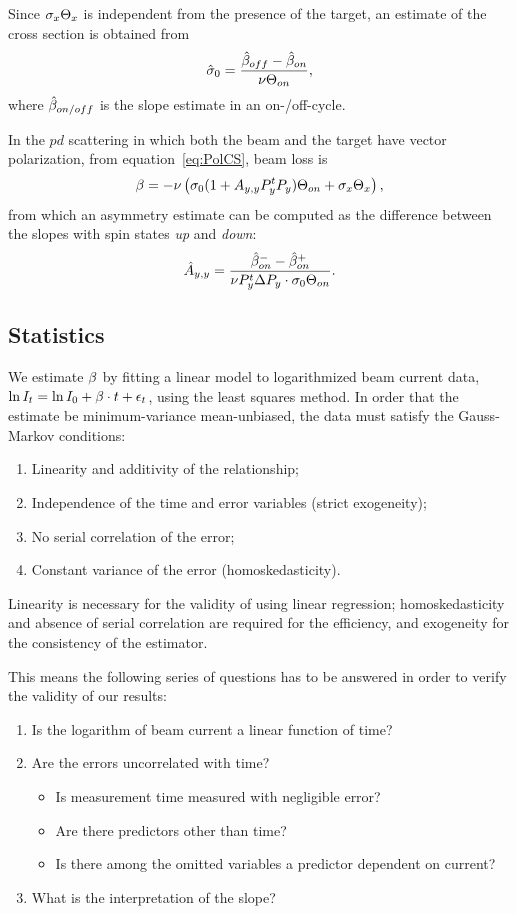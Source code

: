 \documentclass[reprint, superscriptaddress]{revtex4-1}
\begin{document}
Since $\CS[x]\Thick[x]$ is independent from the presence of the target, an estimate of the cross section is obtained from  
\begin{equation}
	\CS*[0] = \frac{\slp*[off] - \slp*[on]}{\nu\Thick[on]},
\end{equation}
where $\slp*[on/off]$ is the slope estimate in an on-/off-cycle.

In the $pd$ scattering in which both the beam and the target have vector polarization, from equation~\eqref{eq:PolCS}, beam loss is
\[
	\slp = -\nu\bkt{\CS[0](1 + \Ayy P_y^t P_y)\Thick[on] + \CS[x]\Thick[x]},
\]
from which an asymmetry estimate can be computed as the difference between the slopes with spin states \emph{up} and \emph{down}:
\begin{equation}\label{eq:AyyEst}
	\Ayy* = \frac{\slp*[on]^- - \slp*[on]^+}{\nu P_y^t\Delta P_y\cdot \CS[0]\Thick[on]}.
\end{equation}

\subsection{Statistics}

We estimate $\slp$ by fitting a linear model to logarithmized beam current data, $\ln I_t = \ln I_0 + \slp\cdot t + \epsilon_t$, using the least squares method. In order that the estimate be minimum-variance mean-unbiased, the data must satisfy the Gauss-Markov conditions:~\cite{GaussMarkov}
\begin{enumerate}
	\item Linearity and additivity of the relationship;
	\item Independence of the time and error variables (strict exogeneity);
	\item No serial correlation of the error;
	\item Constant variance of the error (homoskedasticity).
\end{enumerate}

Linearity is necessary for the validity of using linear regression; homoskedasticity and absence of serial correlation are required for the efficiency, and exogeneity for the consistency of the estimator.

This means the following series of questions has to be answered in order to verify the validity of our results:
\begin{enumerate}
	\item Is the logarithm of beam current a linear function of time?
	\item Are the errors uncorrelated with time?
		\begin{itemize}
			\item Is measurement time measured with negligible error?
			\item Are there predictors other than time?
			\item Is there among the omitted variables a predictor dependent on current?
		\end{itemize}
	\item What is the interpretation of the slope?
\end{enumerate}
\end{document}

